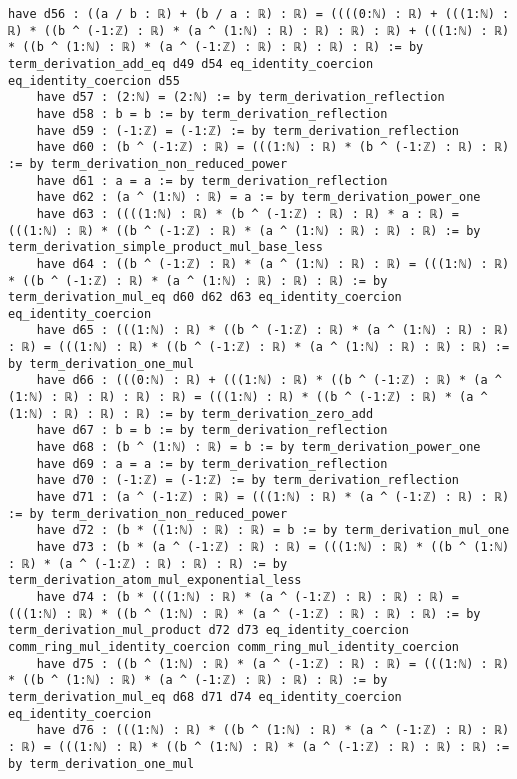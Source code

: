 \documentclass{article}
\begin{document}
\begin{tcolorbox}[colback=white!10, width=\linewidth]
\begin{lstlisting}[language=Lean4]
    have d56 : ((a / b : ℝ) + (b / a : ℝ) : ℝ) = ((((0:ℕ) : ℝ) + (((1:ℕ) : ℝ) * ((b ^ (-1:ℤ) : ℝ) * (a ^ (1:ℕ) : ℝ) : ℝ) : ℝ) : ℝ) + (((1:ℕ) : ℝ) * ((b ^ (1:ℕ) : ℝ) * (a ^ (-1:ℤ) : ℝ) : ℝ) : ℝ) : ℝ) := by term_derivation_add_eq d49 d54 eq_identity_coercion eq_identity_coercion d55
    have d57 : (2:ℕ) = (2:ℕ) := by term_derivation_reflection
    have d58 : b = b := by term_derivation_reflection
    have d59 : (-1:ℤ) = (-1:ℤ) := by term_derivation_reflection
    have d60 : (b ^ (-1:ℤ) : ℝ) = (((1:ℕ) : ℝ) * (b ^ (-1:ℤ) : ℝ) : ℝ) := by term_derivation_non_reduced_power
    have d61 : a = a := by term_derivation_reflection
    have d62 : (a ^ (1:ℕ) : ℝ) = a := by term_derivation_power_one
    have d63 : ((((1:ℕ) : ℝ) * (b ^ (-1:ℤ) : ℝ) : ℝ) * a : ℝ) = (((1:ℕ) : ℝ) * ((b ^ (-1:ℤ) : ℝ) * (a ^ (1:ℕ) : ℝ) : ℝ) : ℝ) := by term_derivation_simple_product_mul_base_less
    have d64 : ((b ^ (-1:ℤ) : ℝ) * (a ^ (1:ℕ) : ℝ) : ℝ) = (((1:ℕ) : ℝ) * ((b ^ (-1:ℤ) : ℝ) * (a ^ (1:ℕ) : ℝ) : ℝ) : ℝ) := by term_derivation_mul_eq d60 d62 d63 eq_identity_coercion eq_identity_coercion
    have d65 : (((1:ℕ) : ℝ) * ((b ^ (-1:ℤ) : ℝ) * (a ^ (1:ℕ) : ℝ) : ℝ) : ℝ) = (((1:ℕ) : ℝ) * ((b ^ (-1:ℤ) : ℝ) * (a ^ (1:ℕ) : ℝ) : ℝ) : ℝ) := by term_derivation_one_mul
    have d66 : (((0:ℕ) : ℝ) + (((1:ℕ) : ℝ) * ((b ^ (-1:ℤ) : ℝ) * (a ^ (1:ℕ) : ℝ) : ℝ) : ℝ) : ℝ) = (((1:ℕ) : ℝ) * ((b ^ (-1:ℤ) : ℝ) * (a ^ (1:ℕ) : ℝ) : ℝ) : ℝ) := by term_derivation_zero_add
    have d67 : b = b := by term_derivation_reflection
    have d68 : (b ^ (1:ℕ) : ℝ) = b := by term_derivation_power_one
    have d69 : a = a := by term_derivation_reflection
    have d70 : (-1:ℤ) = (-1:ℤ) := by term_derivation_reflection
    have d71 : (a ^ (-1:ℤ) : ℝ) = (((1:ℕ) : ℝ) * (a ^ (-1:ℤ) : ℝ) : ℝ) := by term_derivation_non_reduced_power
    have d72 : (b * ((1:ℕ) : ℝ) : ℝ) = b := by term_derivation_mul_one
    have d73 : (b * (a ^ (-1:ℤ) : ℝ) : ℝ) = (((1:ℕ) : ℝ) * ((b ^ (1:ℕ) : ℝ) * (a ^ (-1:ℤ) : ℝ) : ℝ) : ℝ) := by term_derivation_atom_mul_exponential_less
    have d74 : (b * (((1:ℕ) : ℝ) * (a ^ (-1:ℤ) : ℝ) : ℝ) : ℝ) = (((1:ℕ) : ℝ) * ((b ^ (1:ℕ) : ℝ) * (a ^ (-1:ℤ) : ℝ) : ℝ) : ℝ) := by term_derivation_mul_product d72 d73 eq_identity_coercion comm_ring_mul_identity_coercion comm_ring_mul_identity_coercion
    have d75 : ((b ^ (1:ℕ) : ℝ) * (a ^ (-1:ℤ) : ℝ) : ℝ) = (((1:ℕ) : ℝ) * ((b ^ (1:ℕ) : ℝ) * (a ^ (-1:ℤ) : ℝ) : ℝ) : ℝ) := by term_derivation_mul_eq d68 d71 d74 eq_identity_coercion eq_identity_coercion
    have d76 : (((1:ℕ) : ℝ) * ((b ^ (1:ℕ) : ℝ) * (a ^ (-1:ℤ) : ℝ) : ℝ) : ℝ) = (((1:ℕ) : ℝ) * ((b ^ (1:ℕ) : ℝ) * (a ^ (-1:ℤ) : ℝ) : ℝ) : ℝ) := by term_derivation_one_mul

\end{lstlisting}
\end{tcolorbox}
\end{document}
